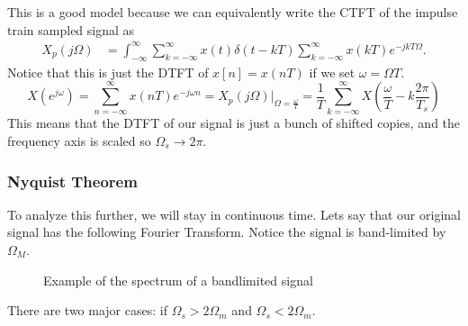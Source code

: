 This is a good model because we can equivalently write the CTFT of the impulse train sampled signal as
\begin{align*}
  X_p(j\Omega) &= \int_{-\infty}^{\infty}\sum_{k=-\infty}^{\infty}{x(t)\delta(t-kT)} \sum_{k=-\infty}^{\infty}x(kT)e^{-jkT\Omega}.
\end{align*}
Notice that this is just the DTFT of $x[n]=x(nT)$ if we set $\omega = \Omega T$.
\[
  X(e^{j\omega}) = \sum_{n=-\infty}^{\infty}x(nT)e^{-j\omega n}=X_p(j\Omega)|_{\Omega=\frac{\omega}{T}}=\frac{1}{T}\sum_{k=-\infty}^{\infty}{X\left(\frac{\omega}{T}-k\frac{2\pi}{T_s}\right)}
\]
This means that the DTFT of our signal is just a bunch of shifted copies, and the frequency axis is scaled so $\Omega_s \rightarrow 2\pi$.
\subsubsection{Nyquist Theorem}
To analyze this further, we will stay in continuous time. Lets say that our original signal has the following Fourier Transform. Notice the signal is band-limited by $\Omega_M$.
\begin{gitbook-image}
\begin{figure}[!h]
    \centering
	\caption{Example of the spectrum of a bandlimited signal}
	\label{fig:bandlimited}
\end{figure}
\end{gitbook-image}
There are two major cases: if $\Omega_s > 2\Omega_m$ and $\Omega_s < 2\Omega_m$.

